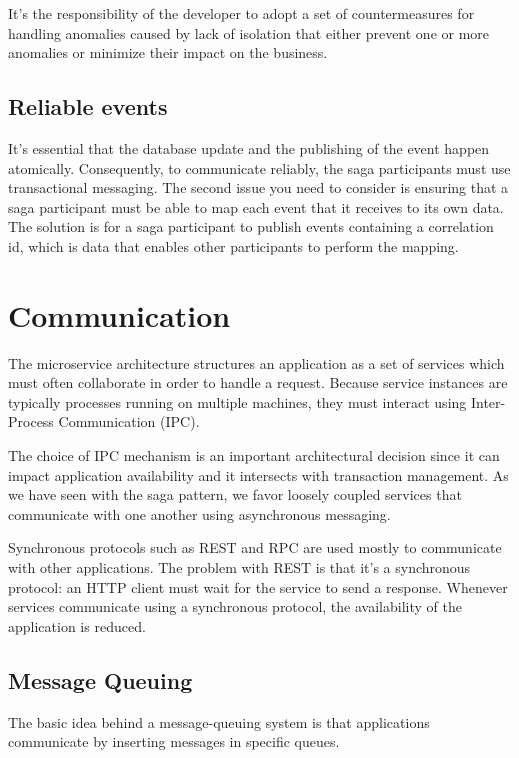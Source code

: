 \documentclass[conference]{IEEEtran}
\begin{document}
It’s the responsibility of the developer to adopt a set of countermeasures for handling anomalies caused by lack of isolation that either prevent one or more anomalies or minimize their impact on the business. \cite{semantic-acid}

\subsection{Reliable events}

It’s essential that the database update and the publishing of the event happen atomically. Consequently, to communicate reliably, the saga participants must use transactional messaging. The second issue you need to consider is ensuring that a saga participant must be able to map each event that it receives to its own data. The solution is for a saga participant to publish events containing a correlation id, which is data that enables other participants to perform the mapping.

\section{Communication}

The microservice architecture structures an application as a set of services which must often collaborate in order to handle a request. Because service instances are typically processes running on multiple machines, they must interact using Inter-Process Communication (IPC).

The choice of IPC mechanism is an important architectural decision since it can impact application availability and it intersects with transaction management. As we have seen with the saga pattern, we favor loosely coupled services that communicate with one another using asynchronous messaging.

Synchronous protocols such as REST and RPC are used mostly to communicate with other applications. The problem with REST is that it’s a synchronous protocol: an HTTP client must wait for the service to send a response. Whenever services communicate using a synchronous protocol, the availability of the application is reduced.

\subsection{Message Queuing}

The basic idea behind a message-queuing system is that applications communicate by inserting messages in specific queues. 
\end{document}
